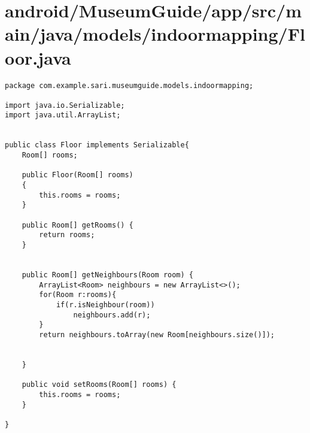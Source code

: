 \section{android/MuseumGuide/app/src/main/java/models/indoormapping/Floor.java}
\begin{lstlisting}package com.example.sari.museumguide.models.indoormapping;

import java.io.Serializable;
import java.util.ArrayList;


public class Floor implements Serializable{
    Room[] rooms;

    public Floor(Room[] rooms)
    {
        this.rooms = rooms;
    }

    public Room[] getRooms() {
        return rooms;
    }


    public Room[] getNeighbours(Room room) {
        ArrayList<Room> neighbours = new ArrayList<>();
        for(Room r:rooms){
            if(r.isNeighbour(room))
                neighbours.add(r);
        }
        return neighbours.toArray(new Room[neighbours.size()]);


    }

    public void setRooms(Room[] rooms) {
        this.rooms = rooms;
    }

}
\end{lstlisting}
\newpage
